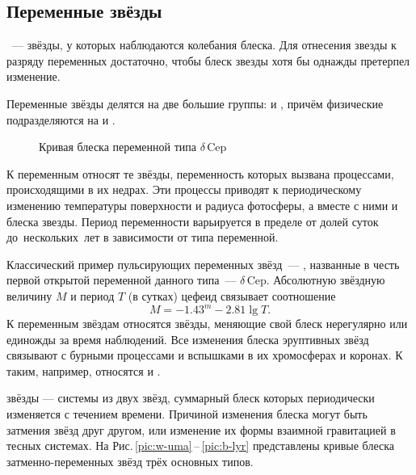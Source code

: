 \subsection{Переменные звёзды}
~--- звёзды, у которых наблюдаются колебания блеска.   Для отнесения звезды к разряду переменных достаточно, чтобы блеск звезды хотя бы однажды претерпел изменение.

Переменные звёзды делятся на две большие группы:  и , причём физические подразделяются на  и .

\begin{wrapfigure}[11]{l}{0.5\tw}
	\centering
	\vspace{-1.2pc}
	\caption{Кривая блеска переменной типа $\delta$\,Cep}
	\label{pic:d-cep}
\end{wrapfigure}
К  переменным  относят те звёзды, переменность которых вызвана процессами, происходящими в их недрах. Эти процессы приводят к периодическому изменению температуры поверхности и радиуса фотосферы, а вместе с ними и блеска звезды. Период переменности варьируется в пределе от долей суток до~нескольких~лет в зависимости от типа переменной.

Классический пример пульсирующих переменных звёзд~--- , названные в честь первой открытой переменной данного типа~--- $\delta$\,Cep. Абсолютную звёздную величину $M$ и период $T$ (в сутках) цефеид связывает соотношение
\begin{equation}
	M = -1.43^m - 2.81\lg T.
\end{equation}
К  переменным звёздам относятся звёзды, меняющие свой блеск нерегулярно или единожды за время наблюдений. Все изменения блеска эруптивных звёзд связывают с бурными процессами и вспышками в их хромосферах и коронах. К таким, например, относятся  и .

 звёзды --- системы из двух звёзд, суммарный блеск которых периодически изменяется с течением времени. Причиной изменения блеска могут быть затмения звёзд друг другом, или изменение их формы взаимной гравитацией в тесных системах. На Рис.\,\ref{pic:w-uma}\,--\,\ref{pic:b-lyr}  представлены кривые блеска затменно-переменных звёзд трёх основных типов.

